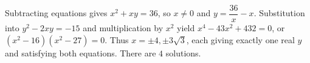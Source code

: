 Subtracting equations gives $x^2+xy=36$, so $x\ne0$ and $y=\dfrac{36}{x}-x$. Substitution into $y^2-2xy=-15$ and multiplication by $x^2$ yield $x^4-43x^2+432=0$, or $(x^2-16)(x^2-27)=0$. Thus $x=\pm4,\pm3\sqrt3$, each giving exactly one real $y$ and satisfying both equations. There are $\boxed4$ solutions.
